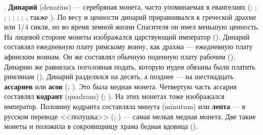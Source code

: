. \textbf{Динарий} (denarius) --- серебряная
монета, часто упоминаемая в евангелиях (;
; ; ;
; ; ;
, также ). По весу и ценности
динарий приравнивался к греческой драхме или 1/4 сикля, но во время
земной жизни Спасителя он имел меньшую ценность. На лицевой стороне
монеты изображался царствующий император
().  Динарий составлял
ежедневную плату римскому воину, как драхма --- ежедневную плату
афинским воинам. Он же составлял обычную поденную плату рабочим
(). Динарию же равнялась поголовная подать, которую
иудеи обязаны были платить римлянам (). Динарий
разделялся на десять, а позднее --- на шестнадцать \textbf{ассариев}
или \textbf{асов} (; ). Это была
медная монета. Четвертую часть ассария составлял \textbf{кодрант}
(quadrans) (; ). На этих монетах
тоже изображался император. Половину кодранта составляла минута
(minutum) или \textbf{лепта} --- в русском переводе <<полушка>>
(; ) --- самая мелкая медная
монета. Две такие монеты и положила в сокровищницу храма бедная
вдовица ().
